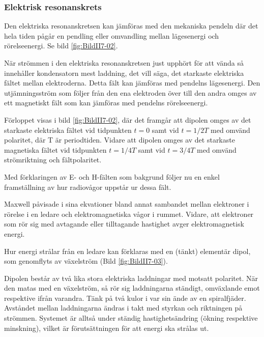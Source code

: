 \subsubsection{Elektrisk resonanskrets}

Den elektriska resonanskretsen kan jämföras med den mekaniska pendeln där det
hela tiden pågår en pendling eller omvandling mellan lägesenergi och
rörelseenergi.
Se bild \ref{fig:BildII7-02}.

När strömmen i den elektriska resonanskretsen just upphört för att vända så
innehåller kondensatorn mest laddning, det vill säga, det starkaste elektriska
fältet mellan elektroderna.
Detta fält kan jämföras med pendelns lägesenergi.
Den utjämningsström som följer från den ena elektroden över till den andra
omges av ett magnetiskt fält som kan jämföras med pendelns rörelseenergi.

Förloppet visas i bild \ref{fig:BildII7-02}, där det framgår att dipolen omges
av det starkaste elektriska fältet vid tidpunkten \(t=0\) samt vid
\(t=1/2T\) med omvänd polaritet, där T är periodtiden.
Vidare att dipolen omges av det starkaste magnetiska fältet vid tidpunkten
\(t=1/4T\) samt vid \(t=3/4T\) med omvänd strömriktning och fältpolaritet.



Med förklaringen av E- och H-fälten som bakgrund följer nu en enkel
framställning av hur radiovågor uppstår ur dessa fält.

Maxwell påvisade i sina ekvationer bland annat sambandet mellan elektroner
i rörelse i en ledare och elektromagnetiska vågor i rummet.
Vidare, att elektroner som rör sig med avtagande eller tilltagande hastighet
avger elektromagnetisk energi.

Hur energi strålar från en ledare kan förklaras med en (tänkt)
elementär dipol, som genomflyts av växelström (Bild \ref{fig:BildII7-03}).

Dipolen består av två lika stora elektriska laddningar med motsatt polaritet.
När den matas med en växelström, så rör sig laddningarna ständigt,
omväxlande emot respektive ifrån varandra.
Tänk på två kulor i var sin ände av en spiralfjäder.
Avståndet mellan laddningarna ändras i takt med styrkan och riktningen på
strömmen.
Systemet är alltså under ständig hastighetsändring (ökning respektive
minskning), vilket är förutsättningen för att energi ska strålas ut.

